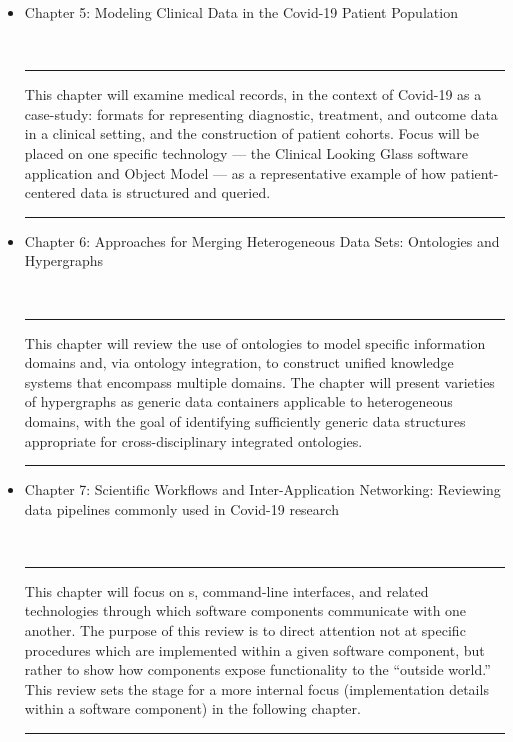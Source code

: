 \documentclass{statsoc}
\newcommand{\textscc}[1]{{\color{orr!35!black}{{%
						\fontfamily{Cabin-TLF}\fontseries{b}\selectfont{\textsc{\scriptsize{#1}}}}}}}
\newcommand{\AcronymText}[1]{{\textscc{#1}}}
\newcommand{\q}[1]{{\fontfamily{qcr}\selectfont ``}#1{\fontfamily{qcr}\selectfont ''}}
\newcommand{\API}{\resizebox{!}{7pt}{\AcronymText{API}}}
\newenvironment{summary}{\\\vspace{-4pt}%
%
%
\noindent\hfil\textcolor{rgrey!50!purple}{\rule{0.5\textwidth}{.4pt}}\hfil

\hspace{-2cm}\begin{minipage}{1.02\textwidth}\fontfamily{phv}\fontsize{9}{11}\selectfont}%
{\\\vspace{-1em}\end{minipage}
{\begin{center}\textcolor{rgrey!50!yellow}{\rule{0.5\textwidth}{.4pt}}\end{center}}
\vspace{2em}}%
\begin{document}
{\begin{description}
\begin{itemize}
\item Chapter 5: Modeling Clinical Data in the Covid-19 Patient Population  

\begin{summary}
This chapter will examine medical records, in the context of 
Covid-19 as a case-study: formats for representing 
diagnostic, treatment, and outcome data in a clinical setting, 
and the construction of patient cohorts.  Focus will be 
placed on one specific technology --- the 
Clinical Looking Glass software application and Object Model --- 
as a representative example of how patient-centered 
data is structured and queried.
\end{summary}

\end{itemize}

\item[Part II: Creating a Cross-Disciplinary Ecosystem for Covid-19]

\begin{itemize}

\item Chapter 6: Approaches for Merging Heterogeneous Data Sets: Ontologies and Hypergraphs

\begin{summary}
This chapter will review the use of ontologies to model 
specific information domains and, via ontology integration, 
to construct unified knowledge systems that encompass 
multiple domains.  The chapter will present varieties 
of hypergraphs as generic data containers applicable 
to heterogeneous domains, with the goal of identifying 
sufficiently generic data structures appropriate 
for cross-disciplinary integrated ontologies.   
\end{summary}

\item Chapter 7: Scientific Workflows and Inter-Application Networking: 
Reviewing data pipelines commonly used in Covid-19 research

\begin{summary}
This chapter will focus on \API{}s, command-line interfaces, 
and related technologies through which software components 
communicate with one another.  The purpose of this review is 
to direct attention not at specific procedures which are 
implemented within a given software component, but rather 
to show how components expose functionality to the 
\q{outside world.}  This review sets the 
stage for a more internal focus (implementation 
details within a software component) in the following chapter. 
\end{summary}


\end{itemize}
\end{description}}
\end{document}
